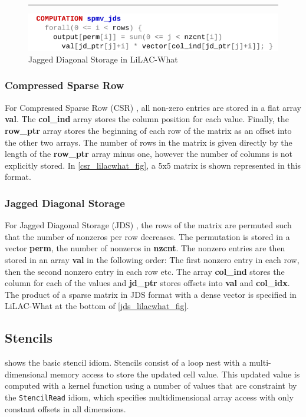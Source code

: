 \begin{figure}[t]
\begin{minipage}[b]{0.65\linewidth}
\begin{align*}
\end{align*}
\end{minipage}
\vspace{0.5em}
\hrule
\vspace{0.3em}
\includegraphics[width=\linewidth]{figures/spmvjdswhat.pdf}
\vspace{-1.2em}
\caption{Jagged Diagonal Storage in LiLAC-What}
\label{jds_lilacwhat_fig}
\end{figure}

\subsubsection{Compressed Sparse Row}
For Compressed Sparse Row (CSR) \cite{doi:10.1137/1.9780898718003}, all non-zero
entries are stored in a flat array \textbf{val}.
The \textbf{col\_ind} array stores the column position for each value.
Finally, the \textbf{row\_ptr} array stores the beginning of each row of the
matrix as an offset into the other two arrays.
The number of rows in the matrix is given directly by the length of the
\textbf{row\_ptr} array minus one, however the number of columns is not
explicitly stored.
In \autoref{csr_lilacwhat_fig}, a 5x5 matrix is shown represented in this
format.

\subsubsection{Jagged Diagonal Storage}
For Jagged Diagonal Storage (JDS) \cite{doi:10.1137/0910073}, the rows of the
matrix are permuted such that the number of nonzeros  per row  decreases. The
permutation is stored in a vector \textbf{perm}, the number of nonzeros in
\textbf{nzcnt}.
The nonzero entries are then stored in an array \textbf{val} in the following
order: The first nonzero entry in each row, then the second nonzero entry in
each row etc.
The array \textbf{col\_ind} stores the column for each of the values and
\textbf{jd\_ptr} stores offsets into \textbf{val} and \textbf{col\_idx}.
The product of a sparse matrix in JDS format with a dense vector is specified 
in LiLAC-What at the bottom of \autoref{jds_lilacwhat_fig}.

\subsection{Stencils}
     shows the basic stencil idiom.
    Stencils consist of a loop nest with a multi-dimensional memory access to
    store the updated cell value.
    This updated value is computed with a kernel function using a number of
    values that are constraint by the
    \texttt{StencilRead} idiom, which specifies multidimensional array access
    with only constant offsets in all dimensions.

